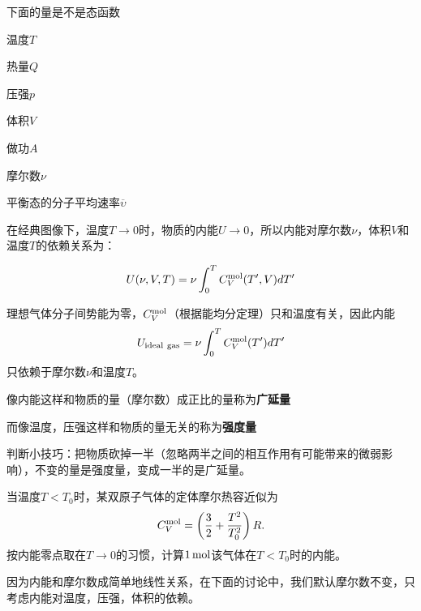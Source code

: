 \documentclass[CJK]{beamer}
\begin{document}
\begin{frame}
\bch
{\large
下面的量是不是态函数
\bitem
\item{温度$T$}
\item{热量$Q$}
\item{压强$p$}
\item{体积$V$}
\item{做功$A$}
\item{摩尔数$\nu$}
\item{平衡态的分子平均速率$\overline{\upsilon}$}
  \eitem
  }
\ech
\end{frame}

\begin{frame}
\bch

{\large
  在经典图像下，温度$T\rightarrow 0$时，物质的内能$U\rightarrow 0$，所以内能对摩尔数$\nu$，体积$V$和温度$T$的依赖关系为：

  {\blue  $$ U(\nu, V, T) = \nu \int_0^TC_V^{\rm mol}(T',V) dT' $$ }

  {\blue 理想气体}分子间势能为零，$C_V^{\rm mol}$（根据能均分定理）只和温度有关，因此内能
  {\blue  $$ U_{\rm ideal\ gas} = \nu \int_0^TC_V^{\rm mol}(T') dT' $$ }
    只依赖于摩尔数$\nu$和温度$T$。
}
\ech
\end{frame}

\begin{frame}
\bch

{\large
  \bitem
\item{像内能这样和物质的量（摩尔数）成正比的量称为{\bf 广延量}}

\item{而像温度，压强这样和物质的量无关的称为{\bf 强度量}}

  \eitem

  
  判断小技巧：把物质砍掉一半（忽略两半之间的相互作用有可能带来的微弱影响），不变的量是强度量，变成一半的是广延量。
}
\ech
\end{frame}

\begin{frame}
\bch
{}

{\large
  当温度$T<T_0$时，某双原子气体的定体摩尔热容近似为
  $$C_V^{\rm mol} = \left(\frac{3}{2} + \frac{T^2}{T_0^2}\right)R.$$
  按内能零点取在$T\rightarrow 0$的习惯，计算$1\,\mathrm{mol}$该气体在$T<T_0$时的内能。
}
\ech
\end{frame}



\begin{frame}
\bch
    {\huge
因为内能和摩尔数成简单地线性关系，在下面的讨论中，我们默认摩尔数不变，只考虑内能对温度，压强，体积的依赖。
      }

\ech
\end{frame}
\end{document}
